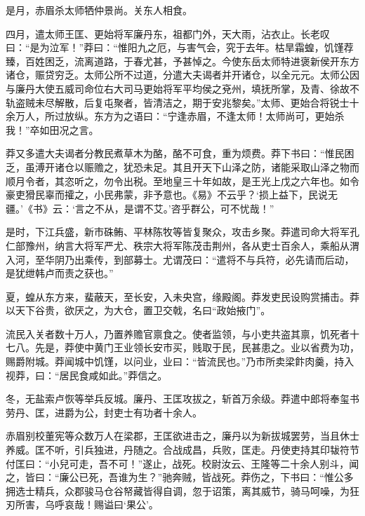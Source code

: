 \documentclass[12pt,UTF8]{ctexbook}
\begin{document}
是月，赤眉杀太师牺仲景尚。关东人相食。



四月，遣太师王匡、更始将军廉丹东，祖都门外，天大雨，沾衣止。长老叹曰：“是为泣军！”莽曰：“惟阳九之厄，与害气会，究于去年。枯旱霜蝗，饥馑荐臻，百姓困乏，流离道路，于春尤甚，予甚悼之。今使东岳太师特进褒新侯开东方诸仓，赈贷穷乏。太师公所不过道，分遣大夫谒者并开诸仓，以全元元。太师公因与廉丹大使五威司命位右大司马更始将军平均侯之兗州，填抚所掌，及青、徐故不轨盗贼未尽解散，后复屯聚者，皆清洁之，期于安兆黎矣。”太师、更始合将锐士十余万人，所过放纵。东方为之语曰：“宁逢赤眉，不逢太师！太师尚可，更始杀我！”卒如田况之言。



莽又多遣大夫谒者分教民煮草木为酪，酪不可食，重为烦费。莽下书曰：“惟民困乏，虽溥开诸仓以赈赡之，犹恐未足。其且开天下山泽之防，诸能采取山泽之物而顺月令者，其恣听之，勿令出税。至地皇三十年如故，是王光上戊之六年也。如令豪吏猾民辜而攉之，小民弗蒙，非予意也。《易》不云乎？‘损上益下，民说无疆。’《书》云：‘言之不从，是谓不艾。’咨乎群公，可不忧哉！”



是时，下江兵盛，新市硃鲔、平林陈牧等皆复聚众，攻击乡聚。莽遣司命大将军孔仁部豫州，纳言大将军严尤、秩宗大将军陈茂击荆州，各从吏士百余人，乘船从渭入河，至华阴乃出乘传，到部募士。尤谓茂曰：“遣将不与兵符，必先请而后动，是犹绁韩卢而责之获也。”



夏，蝗从东方来，蜚蔽天，至长安，入未央宫，缘殿阁。莽发吏民设购赏捕击。莽以天下谷贵，欲厌之，为大仓，置卫交戟，名曰“政始掖门”。



流民入关者数十万人，乃置养赡官禀食之。使者监领，与小吏共盗其禀，饥死者十七八。先是，莽使中黄门王业领长安市买，贱取于民，民甚患之。业以省费为功，赐爵附城。莽闻城中饥馑，以问业，业曰：“皆流民也。”乃市所卖梁飰肉羹，持入视莽，曰：“居民食咸如此。”莽信之。



冬，无盐索卢恢等举兵反城。廉丹、王匡攻拔之，斩首万余级。莽遣中郎将奉玺书劳丹、匡，进爵为公，封吏士有功者十余人。



赤眉别校董宪等众数万人在梁郡，王匡欲进击之，廉丹以为新拔城罢劳，当且休士养威。匡不听，引兵独进，丹随之。合战成昌，兵败，匡走。丹使吏持其印韨符节付匡曰：“小兒可走，吾不可！”遂止，战死。校尉汝云、王隆等二十余人别斗，闻之，皆曰：“廉公已死，吾谁为生？”驰奔贼，皆战死。莽伤之，下书曰：“惟公多拥选士精兵，众郡骏马仓谷帑藏皆得自调，忽于诏策，离其威节，骑马呵噪，为狂刃所害，乌呼哀哉！赐谥曰‘果公’。
\end{document}
